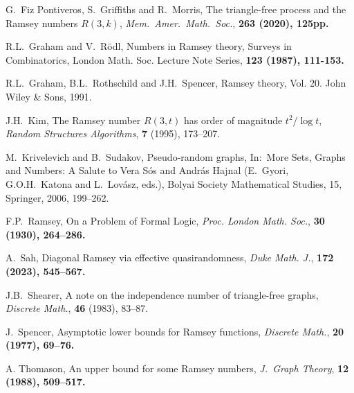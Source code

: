 \documentclass[12pt,reqno]{amsart}
\theoremstyle{definition}
\theoremstyle{remark}
\begin{document}
\begin{thebibliography}{9}
 G.~Fiz Pontiveros, S.~Griffiths and R.~Morris, 
The triangle-free process and the Ramsey numbers $R(3,k)$, 
\emph{Mem.~Amer.~Math.~Soc.}, \bf 263 \rm (2020), 125pp.


 R.L.~Graham and V.~R\"odl, 
Numbers in Ramsey theory, 
Surveys in Combinatorics, London Math. Soc. Lecture Note Series, \bf 123 \rm (1987), 111-153.

 R.L.~Graham, B.L.~Rothschild and J.H.~Spencer, 
Ramsey theory, 
Vol. 20. John Wiley \& Sons, 1991.

 J.H.~Kim, The Ramsey number $R(3,t)$ has order of magnitude $t^2/ \log t$, \emph{Random Structures Algorithms}, \textbf{7} (1995), 173--207.

 M.~Krivelevich and B.~Sudakov, 
Pseudo-random graphs, 
In:~More Sets, Graphs and Numbers: A Salute to Vera Sós and András Hajnal (E.~Gyori, G.O.H.~Katona and L.~Lovász, eds.), Bolyai Society Mathematical Studies, 15, Springer, 2006, 199--262.


 F.P.~Ramsey, 
On a Problem of Formal Logic, 
\emph{Proc. London Math. Soc.}, \bf 30 \rm (1930), 264--286.

 A.~Sah, 
Diagonal Ramsey via effective quasirandomness, 
\emph{Duke Math. J.}, \bf 172 \rm (2023), 545--567.


 J.B.~Shearer, A note on the independence number of triangle-free graphs, \emph{Discrete Math.}, \textbf{46} (1983), 83--87.

 J.~Spencer, 
Asymptotic lower bounds for Ramsey functions, 
\emph{Discrete Math.}, \bf 20 \rm (1977), 69--76. 

 A. Thomason, An upper bound for some Ramsey numbers, \emph{J.~Graph Theory}, \bf 12 \rm (1988), 509--517.


\end{thebibliography}
\end{document}
